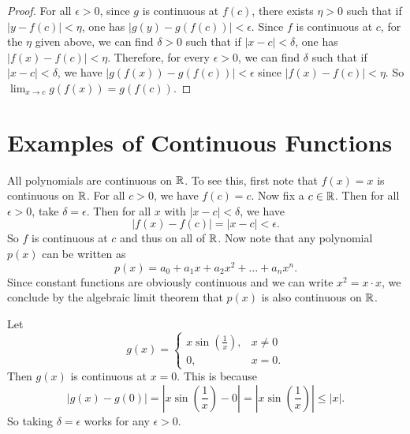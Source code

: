 \begin{proof}
  For all $\epsilon > 0$, since $g$ is continuous at $f(c)$, there
  exists $\eta > 0$ such that if $|y - f(c)| < \eta$,
  one has $|g(y) - g(f(c))| < \epsilon$. Since $f$ is continuous
  at $c$, for the $\eta$ given above, we can find $\delta > 0$
  such that if $|x - c| < \delta$, one has
  $|f(x) - f(c)| < \eta$. Therefore, for every $\epsilon > 0$,
  we can find $\delta$ such that if $|x - c| < \delta$, we have
  $|g(f(x)) - g(f(c))| < \epsilon$ since $|f(x) - f(c)| < \eta$.
  So $\lim_{x \to c} g(f(x)) = g(f(c))$.
\end{proof}

\section{Examples of Continuous Functions}
\begin{example}
  All polynomials are continuous on $\mathbb{R}$. To see this, first note
  that $f(x) = x$ is continuous on $\mathbb{R}$. For all $c > 0$, we have
  $f(c) = c$. Now fix a $c \in \mathbb{R}$. Then for all $\epsilon > 0$,
  take $\delta = \epsilon$. Then for all $x$ with
  $|x - c| < \delta$, we have
  \[|f(x) - f(c)| = |x - c| < \epsilon.\]
  So $f$ is continuous at $c$ and thus on all of $\mathbb{R}$. Now note
  that any
  polynomial $p(x)$ can be written as
  \[p(x) = a_0 + a_1 x + a_2x^2 + \dots + a_nx^n.\]
  Since constant functions are obviously continuous and we can
  write $x^2 = x \cdot x$, we conclude by the algebraic limit
  theorem that $p(x)$ is also continuous on $\mathbb{R}$.
\end{example}

\begin{example}
  Let
  \[
    g(x) = \begin{cases}
      x \sin(\frac{1}{x}), & x \ne 0 \\
      0, & x = 0.
    \end{cases}
  \]
  Then $g(x)$ is continuous at $x = 0$. This is because
  \[
  |g(x) - g(0)| = \left|x \sin\left(\frac{1}{x}\right) - 0\right|
  = \left|x\sin\left(\frac{1}{x}\right)\right| \le |x|
  .\]
  So taking $\delta = \epsilon$ works for any $\epsilon > 0$.
\end{example}

